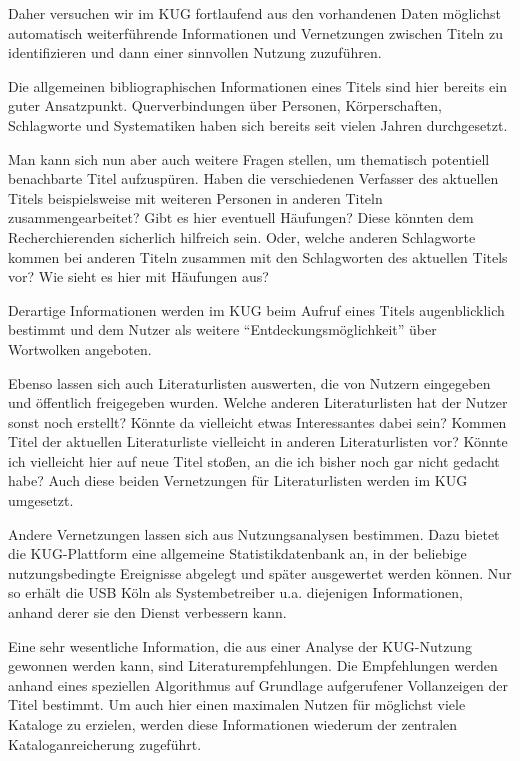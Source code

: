 \documentclass[11pt]{scrartcl}
\begin{document}
Daher versuchen wir im KUG fortlaufend aus den vorhandenen Daten
möglichst automatisch weiterführende Informationen und Vernetzungen
zwischen Titeln zu identifizieren und dann einer sinnvollen Nutzung
zuzuführen.

Die allgemeinen bibliographischen Informationen eines Titels sind hier
bereits ein guter Ansatzpunkt. Querverbindungen über Personen,
Körperschaften, Schlagworte und Systematiken haben sich bereits seit
vielen Jahren durchgesetzt.

Man kann sich nun aber auch weitere Fragen stellen, um thematisch
potentiell benachbarte Titel aufzuspüren. Haben die verschiedenen
Verfasser des aktuellen Titels beispielsweise mit weiteren Personen in
anderen Titeln zusammengearbeitet? Gibt es hier eventuell Häufungen?
Diese könnten dem Recherchierenden sicherlich hilfreich sein. Oder,
welche anderen Schlagworte kommen bei anderen Titeln zusammen mit den
Schlagworten des aktuellen Titels vor? Wie sieht es hier mit Häufungen
aus?

Derartige Informationen werden im KUG beim Aufruf eines Titels
augenblicklich bestimmt und dem Nutzer als weitere
"`Entdeckungsmöglichkeit"' über Wortwolken angeboten.

Ebenso lassen sich auch Literaturlisten auswerten, die von Nutzern
eingegeben und öffentlich freigegeben wurden. Welche anderen
Literaturlisten hat der Nutzer sonst noch erstellt? Könnte da
vielleicht etwas Interessantes dabei sein? Kommen Titel der aktuellen
Literaturliste vielleicht in anderen Literaturlisten vor? Könnte ich
vielleicht hier auf neue Titel stoßen, an die ich bisher noch gar
nicht gedacht habe? Auch diese beiden Vernetzungen für Literaturlisten
werden im KUG umgesetzt.

Andere Vernetzungen lassen sich aus Nutzungsanalysen bestimmen. Dazu
bietet die KUG-Plattform eine allgemeine Statistikdatenbank an, in der
beliebige nutzungsbedingte Ereignisse abgelegt und später ausgewertet
werden können. Nur so erhält die USB Köln als Systembetreiber u.a.
diejenigen Informationen, anhand derer sie den Dienst verbessern kann.

Eine sehr wesentliche Information, die aus einer Analyse der
KUG-Nutzung gewonnen werden kann, sind Literaturempfehlungen. Die
Empfehlungen werden anhand eines speziellen Algorithmus auf Grundlage
aufgerufener Vollanzeigen der Titel bestimmt. Um auch hier einen
maximalen Nutzen für möglichst viele Kataloge zu erzielen, werden
diese Informationen wiederum der zentralen Kataloganreicherung
zugeführt.
\end{document}
